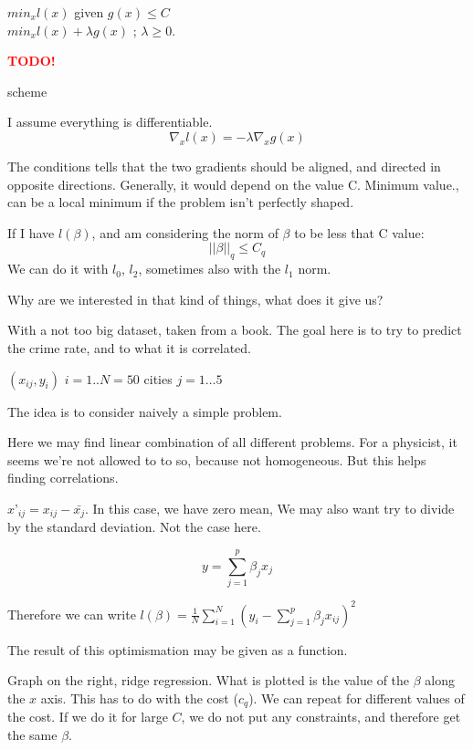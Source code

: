 \documentclass[a4paper]{tufte-book}
\newcommand{\TODO}{\textcolor{red}{\bf TODO!}\xspace}
\begin{document}
$min_x l(x)$ given $g(x)\leq C$\\
$min_x l(x) + \lambda g(x)$  ; $\lambda \geq 0$.

\begin{marginfigure}
\TODO
\caption{scheme}
\label{fig3}
\end{marginfigure}


I assume everything is differentiable.
\begin{equation}
\nabla_x l(x) = -\lambda \nabla_x g(x)
\end{equation}

The conditions tells that the two gradients should be aligned, and directed in opposite directions.
Generally, it would depend on the value C.
Minimum value., can be a local minimum if the problem isn’t perfectly shaped.

If I have $l(\beta)$, and am considering the norm of $\beta$ to be less that C value:
\begin{equation}
||\beta||_q \leq C_q
\end{equation}
We can do it with $l_0$, $l_2$, sometimes also with the $l_1$ norm.

Why are we interested in that kind of things, what does it give us?

With a not too big dataset, taken from a book. The goal here is to try to predict the crime rate, and to what it is correlated.

$(x_{ij}, y_i)$ $i=1..N=50$ cities
$j=1…5$

The idea is to consider naively a simple problem.

Here we may find linear combination of all different problems. For a physicist, it seems we’re not allowed to to so, because not homogeneous. But this helps finding correlations.

$x’_{ij} = x_{ij} - \bar{x_j}$. In this case, we have zero mean, We may also want try to divide by the standard deviation. Not the case here.

\begin{equation}
y=\sum_{j=1}^p \beta_j x_j
\end{equation}

Therefore we can write $l(\beta) = \frac{1}{N} \sum_{i=1}^N (y_i - \sum_{j=1}^p \beta_j x_{ij})^2$

The result of this optimismation may be given as a function.

Graph on the right, ridge regression.
What is plotted is the value of the $\beta$ along the $x$ axis. This has to do with the cost ($c_q$). 
We can repeat for different values of the cost.
If we do it for large $C$, we do not put any constraints, and therefore get the same $\beta$.
\end{document}
